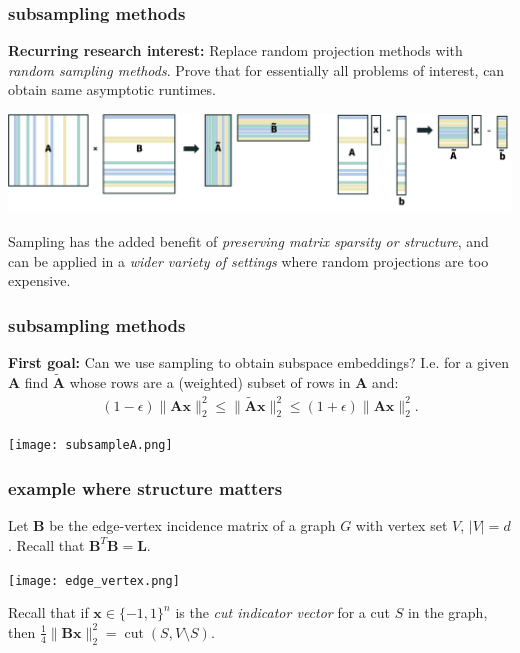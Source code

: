\documentclass[compress]{beamer}
\newcommand{\bv}[1]{\mathbf{#1}}
\DeclareMathOperator{\cut}{cut}
\begin{document}
\begin{frame}
	\frametitle{subsampling methods}
	\begin{center}
		\textbf{Recurring research interest:} Replace random projection methods with \emph{random sampling methods}. Prove that for essentially all problems of interest, can obtain same asymptotic runtimes. 
		
		\vspace{.5em}
		\includegraphics[width=\textwidth]{subsampling_high_level.png}
		
		Sampling has the added benefit of \emph{preserving matrix sparsity or structure}, and can be applied in a \emph{wider variety of settings} where random projections are too expensive.
	\end{center}
\end{frame}


\begin{frame}
	\frametitle{subsampling methods}
	\textbf{First goal:} Can we use sampling to obtain subspace embeddings? I.e. for a given $\bv{A}$ find $\tilde{\bv{A}}$ whose rows are a (weighted) subset of rows in $\bv{A}$ and:
	\begin{align*}
	(1-\epsilon)\|\bv{A}\bv{x}\|_2^2 \leq \|\tilde{\bv{A}}\bv{x}\|_2^2 \leq (1+\epsilon)\|\bv{A}\bv{x}\|_2^2.
	\end{align*}
	\begin{center}
	\texttt{[image: subsampleA.png]}
	\end{center}
	
	
\end{frame}

\begin{frame}
	\frametitle{example where structure matters}
	Let $\bv{B}$ be the edge-vertex incidence matrix of a graph $G$ with vertex set $V$, $|V| = d$. Recall that $\bv{B}^T\bv{B} = \bv{L}$.
	\begin{center}
		\texttt{[image: edge\_vertex.png]}
	\end{center}
\vspace{-1em}

Recall that if $\bv{x}\in \{-1,1\}^n$ is the \emph{cut indicator vector} for a cut $S$ in the graph, then $\frac{1}{4}\|\bv{B}\bv{x}\|_2^2 = \cut(S,V\setminus S)$.	
\end{frame}
\end{document}
